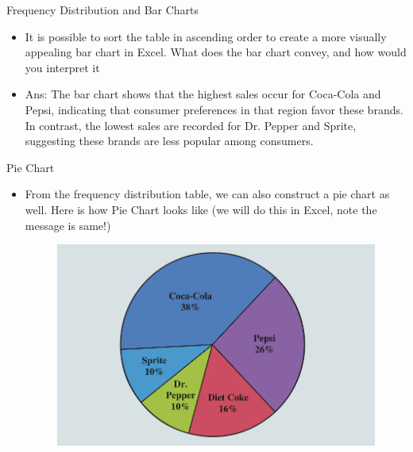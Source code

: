\documentclass[8pt, usepdftitle=false]{beamer}
\begin{document}
\begin{frame}[allowframebreaks]{Frequency Distribution and Bar Charts}
\begin{itemize}
\item It is possible to sort the table in ascending order to create a more visually appealing bar chart in Excel. What does the bar chart convey, and how would you interpret it

\item Ans: The bar chart shows that the highest sales occur for Coca-Cola and Pepsi, indicating that consumer preferences in that region favor these brands. In contrast, the lowest sales are recorded for Dr. Pepper and Sprite, suggesting these brands are less popular among consumers.







\end{itemize}


  
\end{frame}


\begin{frame}[allowframebreaks]{Pie Chart}
\begin{itemize}

\item From the frequency distribution table, we can also construct a pie chart as well. Here is how Pie Chart looks like (we will do this in Excel, note the message is same!)

\begin{figure}
  \includegraphics[scale = .3]{Images/SoftDrink_PieChart.png}
\end{figure}




\end{itemize}
\end{frame}
\end{document}
